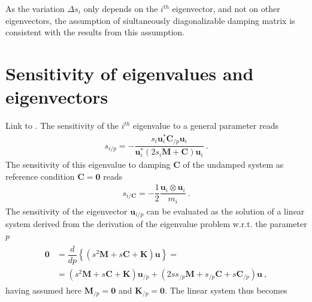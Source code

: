 \documentclass[letterpaper,10pt,english]{jupyterBook}
\begin{document}
\sphinxAtStartPar
As the variation \(\Delta s_i\) only depends on the \(i^{th}\) eigenvector, and not on other eigenvectors, the assumption of siultaneously diagonalizable damping matrix is consistent with the results from this assumption.


\section{Sensitivity of eigenvalues and eigenvectors}
\label{\detokenize{ch/solids/structural-damping:sensitivity-of-eigenvalues-and-eigenvectors}}
\sphinxAtStartPar
Link to .
The sensitivity of the \(i^{th}\) eigenvalue to a general parameter reads
\begin{equation*}
\begin{split}s_{i/p} = - \dfrac{s_i \mathbf{u}_i^* \mathbf{C}_{/p} \mathbf{u}_i}{\mathbf{u}_i^* (2 s_i \mathbf{M} + \mathbf{C} ) \mathbf{u}_i} \ .\end{split}
\end{equation*}
\sphinxAtStartPar
The sensitivity of this eigenvalue to damping \(\mathbf{C}\) of the undamped system as reference condition \(\mathbf{C} = \mathbf{0}\) reads
\begin{equation*}
\begin{split}s_{i/\mathbf{C}} = - \dfrac{1}{2} \dfrac{\mathbf{u}_i \otimes \mathbf{u}_i}{m_i} \ .\end{split}
\end{equation*}
\sphinxAtStartPar
The sensitivity of the eigenvector \(\mathbf{u}_{i/p}\) can be evaluated as the solution of a linear system derived from the derivation of the eigenvalue problem w.r.t. the parameter \(p\)
\begin{equation*}
\begin{split}\begin{aligned}
  \mathbf{0} 
  & = \dfrac{d}{dp}\left\{ \left( s^2 \mathbf{M} + s \mathbf{C} + \mathbf{K} \right) \mathbf{u} \right\} = \\
  & = \left( s^2 \mathbf{M} + s \mathbf{C} + \mathbf{K} \right) \mathbf{u}_{/p} + \left( 2 s s_{/p} \mathbf{M} + s_{/p} \mathbf{C} + s \mathbf{C}_{/p} \right) \mathbf{u} \ ,
\end{aligned}\end{split}
\end{equation*}
\sphinxAtStartPar
having assumed here \(\mathbf{M}_{/p} = \mathbf{0}\) and \(\mathbf{K}_{/p} = \mathbf{0}\). The linear system thus becomes
\end{document}
